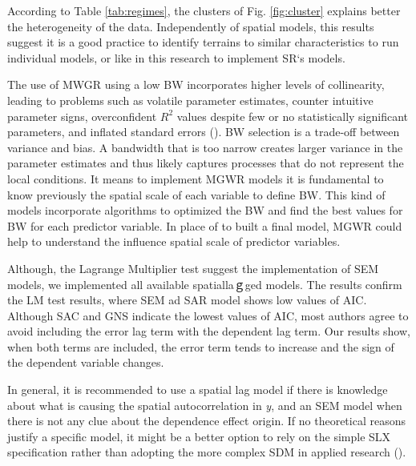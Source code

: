 \documentclass[
  manuscript=article,  
  layout=preprint,  
  year=2023,
  volume=0,
]{format}
\begin{document}
According to Table \ref{tab:regimes}, the clusters of Fig. \ref{fig:cluster} explains better the heterogeneity of the data. Independently of spatial models, this results suggest it is a good practice to identify terrains to similar characteristics to run individual models, or like in this research to implement SR`s models.

\par The use of MWGR using a low BW incorporates higher levels of collinearity, leading to problems such as volatile parameter estimates, counter intuitive parameter signs, overconfident $R^2$ values despite few or no statistically significant parameters, and inflated standard errors (\cite{kyriazos2023dealing}). BW selection is a trade-off between variance and bias. A bandwidth that is too narrow creates larger variance in the parameter estimates and thus likely captures processes that do not represent the local conditions. It means to implement MGWR models it is fundamental to know previously the spatial scale of each variable to define BW. This kind of models incorporate algorithms to optimized the BW and find the best values for BW for each predictor variable. In place of to built a final model, MGWR could help to understand the influence spatial scale of predictor variables.

\par Although, the Lagrange Multiplier test suggest the implementation of SEM models, we implemented all available spatial\-laｇged models. The results confirm the LM test results, where SEM ad SAR model shows low values of AIC. Although SAC and GNS indicate the lowest values of AIC, most authors agree to avoid including the error lag term with the dependent lag term. Our results show, when both terms are included, the error term tends to increase and the sign of the dependent variable changes.

\par In general, it is recommended to use a spatial lag model if there is knowledge about what is causing the spatial autocorrelation in \textit{y}, and an SEM model when there is not any clue about the dependence effect origin. If no theoretical reasons justify a specific model, it might be a better option to rely on the simple SLX specification rather than adopting the more complex SDM in applied research (\cite{halleck2017regional, halleck2015slx}).
\end{document}
